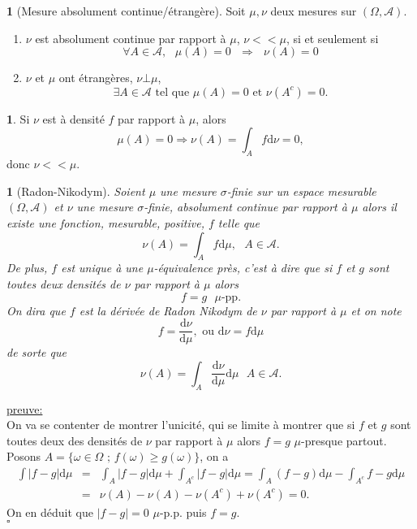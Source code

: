 \documentclass[8pt,notheorems]{beamer}
\def \Om{\Omega}
\def \om{\omega}
\newtheorem{theorem}{\translate{Theorem}}[section]
\newtheorem{theorem}{\translate{Theoreme}}
\theoremstyle{definition}
\newtheorem{definition}{\translate{Definition}}
\theoremstyle{example}
\newtheorem{example}{\translate{Exemple}}
\theoremstyle{mystyle}
\theoremstyle{plain}
\begin{document}
\begin{frame}[allowframebreaks]
\begin{definition}[Mesure absolument continue/étrangère]
Soit $\mu,\nu$ deux mesures sur $(\Om,\mathcal{A})$.
\begin{enumerate}
\item $\nu$ est absolument continue par rapport à $\mu$, $\nu<<\mu$, si et seulement si
$$
\forall A\in\mathcal{A},\text{ }\mu(A)=0\text{ }\Rightarrow\text{ }\nu(A)=0
$$
\item $\nu$ et $\mu$ ont étrangères, $\nu\bot\mu$,
$$
\exists A\in \mathcal{A}\text{ tel que }\mu(A)=0\text{ et }\nu(A^{c})=0.
$$
\end{enumerate}
\end{definition}
\begin{example}
Si $\nu$ est à densité $f$ par rapport à $\mu$, alors 
$$
\mu(A) = 0\Rightarrow \nu(A) = \int_A f\text{d}\nu =0, 
$$ 
donc $\nu <<\mu$.
\end{example}
\begin{theorem}[Radon-Nikodym]
Soient $\mu$ une mesure $\sigma$-finie sur un espace mesurable $(\Omega,\mathcal{A})$ et $\nu$ une mesure $\sigma$-finie, absolument continue par rapport à $\mu$ alors il existe une fonction, mesurable, positive, $f$ telle que
$$
\nu(A)=\int_A f\text{d}\mu,\text{ }A\in \mathcal{A}. 
$$
De plus, $f$ est unique à une $\mu$-équivalence près, c'est à dire que si $f$ et $g$ sont toutes deux densités de $\nu$ par rapport à $\mu$ alors 
$$
f=g\text{ }\mu\text{-pp}.
$$
On dira que $f$ est la dérivée de Radon Nikodym de $\nu$ par rapport à $\mu$ et on note 
$$
f = \frac{\text{d}\nu}{\text{d}\mu},\text{ ou }\text{d}\nu =f\text{d}\mu   
$$
de sorte que 
$$
\nu(A) = \int_{A}\frac{\text{d}\nu}{\text{d}\mu}\text{d}\mu\text{ }A\in \mathcal{A}.
$$
\end{theorem}
\underline{preuve:}\\
On va se contenter de montrer l'unicité, qui se limite à montrer que si $f$ et $g$ sont toutes deux des densités de $\nu$ par rapport à $\mu$ alors $f=g$ $\mu$-presque partout.\\
Posons $A=\{\om\in\Om\text{ ; }f(\om)\geq g(\om)\}$, on a
\begin{eqnarray*}
\int |f-g|\text{d}\mu&=&\int_A |f-g|\text{d}\mu+\int_{A^{c}} |f-g|\text{d}\mu=\int_A (f-g)\text{d}\mu-\int_{A^{c}} f-g\text{d}\mu\\
&=&\nu(A)-\nu(A)-\nu(A^{c})+\nu(A^{c})=0.
\end{eqnarray*}
On en déduit que $|f-g|=0$ $\mu$-p.p. puis $f=g$.\\
$\square$\\


\end{frame}
\end{document}
